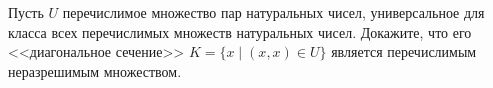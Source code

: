 Пусть $U$ перечислимое множество пар натуральных чисел, универсальное для класса всех перечислимых множеств натуральных
чисел. Докажите, что его <<диагональное сечение>> $K = \{x \mid (x, x) \in U\}$ является перечислимым неразрешимым
множеством.